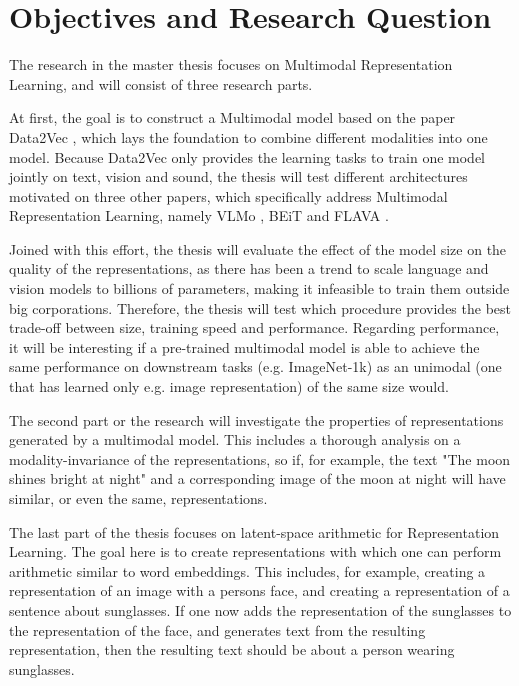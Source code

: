 \section{Objectives and Research Question}

The research in the master thesis focuses on Multimodal Representation Learning, and will consist of three research parts.

At first, the goal is to construct a Multimodal model based on the paper Data2Vec \cite{baevski}, 
which lays the foundation to combine different modalities into one model.
Because Data2Vec only provides the learning tasks to train one model jointly on text, vision and sound,
the thesis will test different architectures motivated on three other papers, which specifically
address Multimodal Representation Learning, namely VLMo \cite{bao}, BEiT \cite{wang} and FLAVA \cite{singh}.

Joined with this effort, the thesis will evaluate the effect
of the model size on the quality of the representations, as there has been a trend to 
scale language and vision models to billions of parameters, making it infeasible to train
them outside big corporations. Therefore, the thesis will test which procedure provides the best trade-off between size,
training speed and performance.
Regarding performance, it will be interesting if a pre-trained multimodal model is able to 
achieve the same performance on downstream tasks (e.g. ImageNet-1k) as an 
unimodal (one that has learned only e.g. image representation) of the same size would.

The second part or the research will investigate the properties of
representations generated by a multimodal model. This includes a thorough analysis on a modality-invariance
of the representations, so if, for example, the text "The moon shines bright at night"
and a corresponding image of the moon at night will have similar, or even the same, representations.

The last part of the thesis focuses on latent-space arithmetic for Representation Learning.
The goal here is to create representations with which one can perform arithmetic similar to word embeddings.
This includes, for example, creating a representation of an image with a persons face, and creating
a representation of a sentence about sunglasses. If one now adds the representation of the sunglasses to
the representation of the face, and generates text from the resulting representation, then the resulting text
should be about a person wearing sunglasses.

